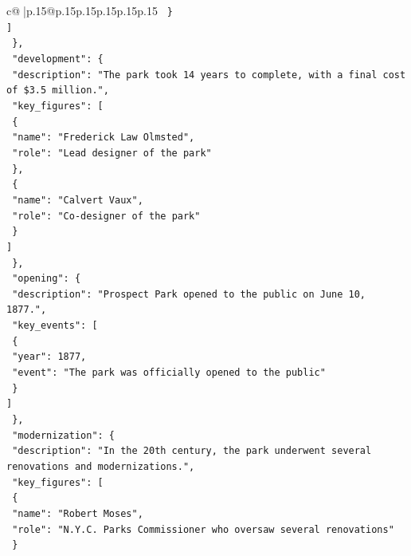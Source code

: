 \documentclass{article}
\begin{document}
{\begin{supertabular}{c@{$\;$}|p{.15\linewidth}@{}p{.15\linewidth}p{.15\linewidth}p{.15\linewidth}p{.15\linewidth}p{.15\linewidth}}
{{{\texttt{        \}} \\
\texttt{      {]}} \\
\texttt{    \},} \\
\texttt{    "development": \{} \\
\texttt{      "description": "The park took 14 years to complete, with a final cost of \$3.5 million.",} \\
\texttt{      "key\_figures": {[}} \\
\texttt{        \{} \\
\texttt{          "name": "Frederick Law Olmsted",} \\
\texttt{          "role": "Lead designer of the park"} \\
\texttt{        \},} \\
\texttt{        \{} \\
\texttt{          "name": "Calvert Vaux",} \\
\texttt{          "role": "Co{-}designer of the park"} \\
\texttt{        \}} \\
\texttt{      {]}} \\
\texttt{    \},} \\
\texttt{    "opening": \{} \\
\texttt{      "description": "Prospect Park opened to the public on June 10, 1877.",} \\
\texttt{      "key\_events": {[}} \\
\texttt{        \{} \\
\texttt{          "year": 1877,} \\
\texttt{          "event": "The park was officially opened to the public"} \\
\texttt{        \}} \\
\texttt{      {]}} \\
\texttt{    \},} \\
\texttt{    "modernization": \{} \\
\texttt{      "description": "In the 20th century, the park underwent several renovations and modernizations.",} \\
\texttt{      "key\_figures": {[}} \\
\texttt{        \{} \\
\texttt{          "name": "Robert Moses",} \\
\texttt{          "role": "N.Y.C. Parks Commissioner who oversaw several renovations"} \\
\texttt{        \}} \\
}}}
\end{supertabular}}
\end{document}

